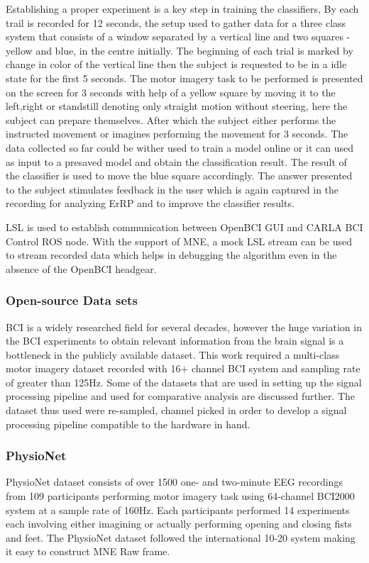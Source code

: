 Establishing a proper experiment is a key step in training the classifiers, By \cite{} each trail is recorded for 12 seconds, the setup used to gather data for a three class system that consists of a window separated by a vertical line and two squares - yellow and blue,  in the centre initially. The beginning of each trial is marked by change in color of the vertical line then the subject is requested to be in a idle state for the first 5 seconds. The motor imagery task to be performed is presented on the screen  for 3 seconds with help of a yellow square by moving it to the left,right or standstill denoting only straight motion without steering, here the subject can prepare themselves. After which the subject either performs the instructed movement or imagines performing the movement for 3 seconds. The data collected so far could be wither used to train a model online or it can used as input to a presaved model and obtain the classification result. The result of the classifier is used to move the blue square accordingly. The answer presented to the subject stimulates feedback in the user which is again captured in the recording for analyzing ErRP and to improve the classifier results.

LSL is used to establish communication between OpenBCI GUI and CARLA BCI Control ROS node. With the support of MNE, a mock LSL stream can be used to stream recorded data which helps in debugging the algorithm even in the absence of the OpenBCI headgear.

\subsubsection{Open-source Data sets}
BCI is a widely researched field for several decades, however the huge variation in the BCI experiments to obtain relevant information from the brain signal is a bottleneck in the publicly available dataset. This work required a multi-class motor imagery dataset recorded with 16+ channel BCI system and sampling rate of greater than 125Hz. Some of the datasets that are used in setting up the signal processing pipeline and used for comparative analysis are discussed further. The dataset thus used were re-sampled, channel picked in order to develop a signal processing pipeline compatible to the hardware in hand.

\subsubsection{PhysioNet}
PhysioNet dataset\cite{2004_Physionet} consists of over 1500 one- and two-minute EEG recordings from 109 participants performing motor imagery task using 64-channel BCI2000 system at a sample rate of 160Hz. Each participants performed 14 experiments each involving either imagining or actually performing opening and closing fists and feet. The PhysioNet dataset followed the international 10-20 system making it easy to construct MNE Raw frame.

